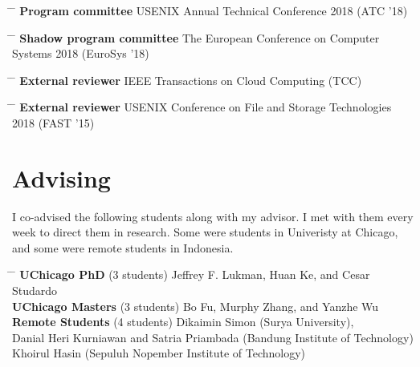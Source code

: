 \documentclass[10pt]{article} %
\begin{document}
\begin{tabbing}
\hspace{2.5cm} \= \hspace{4.5cm}  \=  \> \textbf{Program committee} \> USENIX Annual Technical Conference 2018 (ATC '18)
\end{tabbing}

\begin{tabbing}
\hspace{2.5cm} \= \hspace{4.5cm}  \=  \> \textbf{Shadow program committee} \> The European Conference on Computer Systems 2018 (EuroSys '18)
\end{tabbing}

\begin{tabbing}
\hspace{2.5cm} \= \hspace{4.5cm}  \=  \> \textbf{External reviewer} \> IEEE Transactions on Cloud Computing (TCC)
\end{tabbing}

\begin{tabbing}
\hspace{2.5cm} \= \hspace{4.5cm}  \=  \> \textbf{External reviewer} \> USENIX Conference on File and Storage Technologies 2018 (FAST '15)
\end{tabbing}


\section{Advising}

I co-advised the following students along with my advisor. I met with them
every week to direct them in research. Some were students in Univeristy at
Chicago, and some were remote students in Indonesia.
\begin{tabbing}
\hspace{3.5cm} \= \hspace{2.5cm} \= \kill
\textbf{UChicago PhD} \> (3 students) \> Jeffrey F. Lukman, Huan Ke, and Cesar Studardo\\
\textbf{UChicago Masters} \> (3 students) \> Bo Fu, Murphy Zhang, and Yanzhe Wu\\
\textbf{Remote Students} \> (4 students) \> Dikaimin Simon (Surya University),\\
\> \>Danial Heri Kurniawan and Satria Priambada (Bandung Institute of Technology)\\
\> \>Khoirul Hasin (Sepuluh Nopember Institute of Technology)
\end{tabbing}
\end{document}
